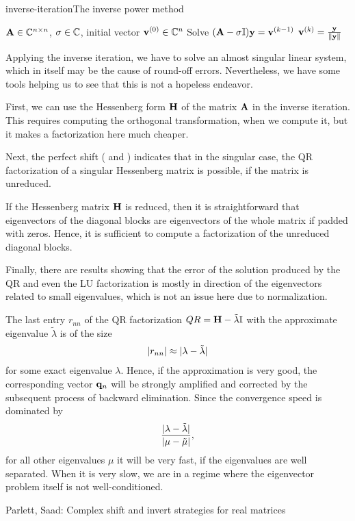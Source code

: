 \begin{Algorithm*}{inverse-iteration}{The inverse power method}
    \begin{algorithmic}[1]
    \Require $\mathbf A\in\mathbb C^{n\times n}$, $\sigma\in\mathbb C$, initial vector $\mathbf v^{(0)}\in\mathbb C^n$
    \State Solve $(\mathbf A-\sigma\mathbb I) \mathbf y = \mathbf v^{(k-1)}$
    \State $\mathbf v^{(k)} = \frac{\mathbf y}{\lVert\mathbf y\rVert}$
    \EndFor
  \end{algorithmic}
\end{Algorithm*}

\begin{remark}
  Applying the inverse iteration, we have to solve an almost singular
  linear system, which in itself may be the cause of round-off
  errors. Nevertheless, we have some tools helping us to see that this
  is not a hopeless endeavor.

  First, we can use the Hessenberg form $\mathbf H$ of the matrix $\mathbf A$
  in the inverse iteration. This requires computing the orthogonal
  transformation, when we compute it, but it makes a factorization
  here much cheaper.

  Next, the perfect shift ( and
  ) indicates that in the singular
  case, the QR factorization of a singular Hessenberg matrix is
  possible, if the matrix is unreduced.

  If the Hessenberg matrix $\mathbf H$ is reduced, then it is
  straightforward that eigenvectors of the diagonal blocks are
  eigenvectors of the whole matrix if padded with zeros. Hence, it is
  sufficient to compute a factorization of the unreduced diagonal
  blocks.

  Finally, there are results showing that the error of the solution
  produced by the QR and even the LU factorization is mostly in
  direction of the eigenvectors related to small eigenvalues, which is
  not an issue here due to normalization.
\end{remark}

\begin{remark}
  The last entry $r_{nn}$ of the QR factorization
  $QR = \mathbf H-\tilde\lambda\mathbb I$ with the approximate eigenvalue
  $\tilde\lambda$ is of the size
  \begin{gather}
    \lvert r_{nn}\rvert \approx \lvert\lambda-\tilde\lambda\rvert
  \end{gather}
  for some exact eigenvalue $\lambda$. Hence, if the approximation is
  very good, the corresponding vector $\mathbf q_n$ will be strongly
  amplified and corrected by the subsequent process of backward
  elimination. Since the convergence speed is dominated by
  \begin{gather}
    \frac{\lvert\lambda-\tilde\lambda\rvert}{\lvert\mu-\tilde\mu\rvert},
  \end{gather}
  for all other eigenvalues $\mu$ it will be very fast, if the
  eigenvalues are well separated. When it is very slow, we are in a
  regime where the eigenvector problem itself is not well-conditioned.
\end{remark}

\begin{todo}
  Parlett, Saad: Complex shift and invert strategies for real matrices
\end{todo}

